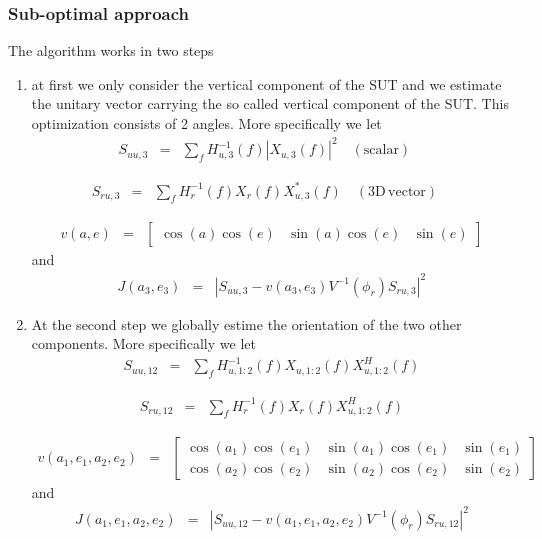 \documentclass[a4paper, 12pt]{report}
\begin{document}
\subsubsection{Sub-optimal approach}
The algorithm works in two steps
\begin{enumerate}
\item
at first we only consider the vertical component of the SUT and we estimate the unitary vector carrying the so called vertical component of the SUT. This optimization consists of 2 angles. More specifically we let
\begin{eqnarray*}
S_{uu,3}&=&\sum_{f} H_{u,3}^{-1}(f)|X_{u,3}(f)|^{2}
\quad \mathrm{(scalar)}\quad
\end{eqnarray*}

\begin{eqnarray*}
S_{ru,3}&=&\sum_{f} H_{r}^{-1}(f)X_{r}(f)X_{u,3}^{*}(f)
\quad \mathrm{(3D\, vector)}\quad
\end{eqnarray*}


\begin{eqnarray*}
v(a,e) &=& \begin{bmatrix}
\cos(a)\cos(e)& \sin(a)\cos(e)& \sin(e)
\end{bmatrix}
\end{eqnarray*}
and
\begin{eqnarray*}
J(a_{3},e_{3}) &=&  \left|S_{uu,3} - v(a_{3},e_{3})V^{-1}(\phi_{r})S_{ru,3} \right|^{2}
\end{eqnarray*}

\item

At the second step we globally estime the orientation of the two other components. More specifically we let
\begin{eqnarray*}
S_{uu,12}&=&\sum_{f} H_{u,1:2}^{-1}(f) X_{u,1:2}(f)X^{H}_{u,1:2}(f)
\end{eqnarray*}

\begin{eqnarray*}
S_{ru,12}&=&\sum_{f} H_{r}^{-1}(f)X_{r}(f)X_{u,1:2}^{H}(f)
\end{eqnarray*}


\begin{eqnarray*}
v(a_{1},e_{1},a_{2},e_{2}) &=& \begin{bmatrix}
\cos(a_{1})\cos(e_{1})& \sin(a_{1})\cos(e_{1})& \sin(e_{1})
\\
\cos(a_{2})\cos(e_{2})& \sin(a_{2})\cos(e_{2})& \sin(e_{2})
\end{bmatrix}
\end{eqnarray*}
and
\begin{eqnarray*}
J(a_{1},e_{1},a_{2},e_{2})  &=&  \left|S_{uu,12} - v(a_{1},e_{1},a_{2},e_{2}) V^{-1}(\phi_{r})S_{ru,12} \right|^{2}
\end{eqnarray*}
\end{enumerate}
\end{document}

